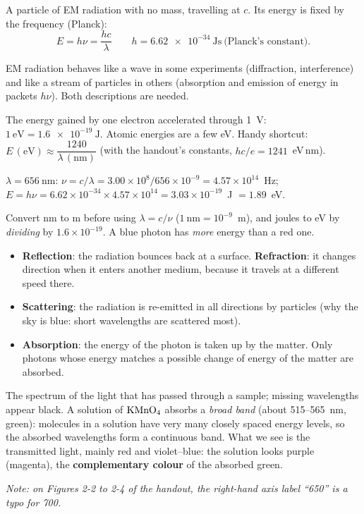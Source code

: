 \begin{concept}[Photon.]
A particle of EM radiation with no mass, travelling at $c$. Its energy is fixed by the frequency
(Planck):
\[\boxed{E = h\nu = \frac{hc}{\lambda}}\qquad h = \SI{6.62e-34}{\joule\second}\ \text{(Planck's constant)}.\]
\end{concept}
\begin{concept}
EM radiation behaves like a wave in some experiments (diffraction, interference) and like a stream of
particles in others (absorption and emission of energy in packets $h\nu$). Both descriptions are
needed.
\end{concept}
\begin{concept}[Electronvolt.]
The energy gained by one electron accelerated through 1~V: $1\ \mathrm{eV} = \SI{1.6e-19}{\joule}$.
Atomic energies are a few eV. Handy shortcut: $E\,(\mathrm{eV}) \approx \dfrac{1240}{\lambda\,(\mathrm{nm})}$
(with the handout's constants, $hc/e = 1241$~eV\,nm).
\end{concept}
\begin{worked}
$\lambda = 656\ \mathrm{nm}$: $\nu = c/\lambda = 3.00\times10^{8}/656\times10^{-9} = 4.57\times10^{14}$~Hz;
$E = h\nu = 6.62\times10^{-34}\times4.57\times10^{14} = 3.03\times10^{-19}$~J $= 1.89$~eV.
\end{worked}
\begin{trap}
Convert nm to m before using $\lambda = c/\nu$ ($1\ \mathrm{nm} = 10^{-9}$~m), and joules to eV by
\emph{dividing} by $1.6\times10^{-19}$. A blue photon has \emph{more} energy than a red one.
\end{trap}

\begin{itemize}
  \item \textbf{Reflection}: the radiation bounces back at a surface. \textbf{Refraction}: it changes
        direction when it enters another medium, because it travels at a different speed there.
  \item \textbf{Scattering}: the radiation is re-emitted in all directions by particles (why the sky
        is blue: short wavelengths are scattered most).
  \item \textbf{Absorption}: the energy of the photon is taken up by the matter. Only photons whose
        energy matches a possible change of energy of the matter are absorbed.
\end{itemize}
\begin{concept}
The spectrum of the light that has passed through a sample; missing wavelengths appear black.
A solution of $\ce{KMnO4}$ absorbs a \emph{broad band} (about 515--565~nm, green): molecules in a
solution have very many closely spaced energy levels, so the absorbed wavelengths form a continuous
band. What we see is the transmitted light, mainly red and violet--blue: the solution looks purple
(magenta), the \textbf{complementary colour} of the absorbed green.
\end{concept}
\textit{Note: on Figures 2-2 to 2-4 of the handout, the right-hand axis label ``650'' is a typo for 700.}

